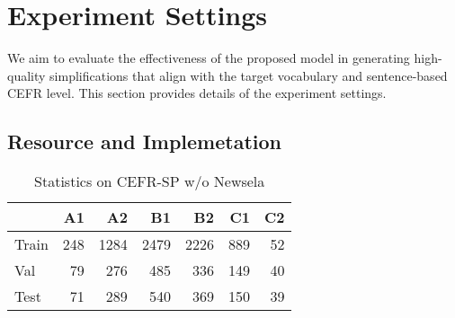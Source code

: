 \section{Experiment Settings}
%
We aim to evaluate the effectiveness of the proposed model in generating high-quality simplifications that align with the target vocabulary and sentence-based CEFR level. 
This section provides details of the experiment settings.

\subsection {Resource and Implemetation}\label{sec:resource}

 \begin{table}[t!] \centering 
 \begin{adjustbox}{width=0.9\linewidth}
\begin{tabular}{lrrrrrr} 
\toprule & A1 & A2 & B1 & B2 & C1 & C2 \\ 
\midrule Train & 248 & 1284 & 2479 & 2226 & 889 & 52 \\
Val & 79 & 276 & 485 & 336 & 149 & 40 \\ 
Test & 71 & 289 & 540 & 369 & 150 & 39 \\ 
\bottomrule 
\end{tabular} 
\end{adjustbox}
\caption{Statistics on CEFR-SP w/o Newsela} 
\label{tab:cefrsp}
 \end{table}

